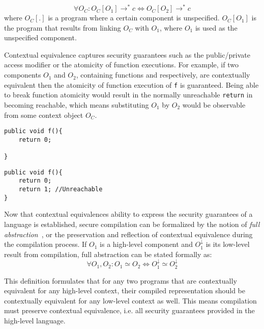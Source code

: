 \documentclass[11pt]{article}
\newcommand{\com}[1]{#1^\downarrow}
\begin{document}
\[
 \forall O_C : O_C[O_1] \rightarrow^* c \iff O_C[O_2] \rightarrow^* c
\]
where $O_{C}[.]$ is a program where a certain component is unspecified. 
$O_{C}[O_1]$ is the program that results from linking $O_C$ with $O_1$, where $O_1$ is used as the unspecified component.

Contextual equivalence captures security guarantees such as the public/private access modifier or the atomicity of function executions. For example, if two components $O_1$ and $O_2$, containing functions  and  respectively, are contextually equivalent then the atomicity of function execution of \lstinline{f} is guaranteed. Being able to break function atomicity would result in the normally unreachable \lstinline{return} in  becoming reachable, which means substituting $O_1$ by $O_2$ would be observable from some context object $O_C$.

\begin{minipage}{0.40\textwidth}
\begin{lstlisting}[label={lst:SimpleReturn}, caption={Simple return}]
public void f(){
    return 0;
    
}
\end{lstlisting}
\end{minipage}
\begin{minipage}{0.40\textwidth}
\begin{lstlisting}[label={lst:UnreachableCode}, caption={Unreachable code}]
public void f(){
    return 0; 
    return 1; //Unreachable
}
\end{lstlisting}
\end{minipage}

Now that contextual equivalences ability to express the security guarantees of a language is established, secure compilation can be formalized by the notion of \emph{full abstraction}~\cite{Abadi}, or the preservation and reflection of contextual equivalence during the compilation process.
If $O_1$ is a high-level component and $\com{O_1}$ is its low-level result from compilation, full abstraction can be stated formally as:
\[
 \forall O_1, O_2 : O_1 \simeq O_2 \iff \com{O_1} \simeq \com{O_2}
\]

This definition formulates that for any two programs that are contextually equivalent for any high-level context, their compiled representation should be contextually equivalent for any low-level context as well. 
This means compilation must preserve contextual equivalence, i.e. all security guarantees provided in the high-level language.
\end{document}
